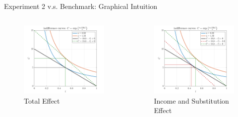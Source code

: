 \documentclass[11pt,aspectratio=43]{beamer}
\theoremstyle{definition}
\begin{document}
\begin{frame}{Experiment 2 v.s. Benchmark: Graphical Intuition}
\label{slide:Solve_for_Experiment_2__Graphical_Intuition}
    \begin{columns}
        \begin{column}{0.5\textwidth}
             \begin{figure}
                \caption{Total Effect}
                 \includegraphics[width=\textwidth]{./figures/Experiment2IC.png}
             \end{figure}
        \end{column}
        \begin{column}{0.5\textwidth}
             \begin{figure}
                \caption{Income and Substitution Effect}
                 \includegraphics[width=\textwidth]{./figures/Experiment2IncomeSubEffect.png}
             \end{figure}
        \end{column}
    \end{columns}
\end{frame}
\end{document}
